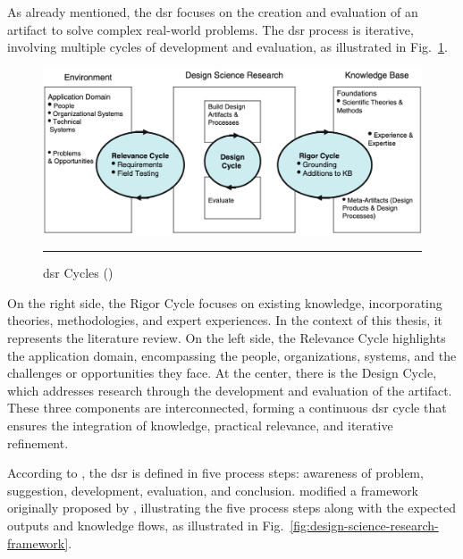 As already mentioned, the \gls{dsr} focuses on the creation and evaluation of an artifact to solve complex real-world problems.
The \gls{dsr} process is iterative, involving multiple cycles of development and evaluation, as illustrated in Fig.~\ref{fig:design-science-research-cycles}.

\begin{figure}[htbp]
    \centering
 \includegraphics[width=.9\textwidth]{03_Figures/research-methods/design-science-research-cycles.png}
     \rule{35em}{0.5pt}
    \caption{\acrlong{dsr} Cycles (\textcite{Hevner2010}) } 
 \label{fig:design-science-research-cycles}
\end{figure}

On the right side, the Rigor Cycle focuses on existing knowledge, incorporating theories, methodologies, and expert experiences.
In the context of this thesis, it represents the literature review.
On the left side, the Relevance Cycle highlights the application domain, encompassing the people, organizations, systems, and the challenges or opportunities they face.
At the center, there is the Design Cycle, which addresses research through the development and evaluation of the artifact.
These three components are interconnected, forming a continuous \gls{dsr} cycle that ensures the integration of knowledge, practical relevance, and iterative refinement.

According to \textcite{Hevner2010}, the \gls{dsr} is defined in five process steps: awareness of problem, suggestion, development, evaluation, and conclusion.
\textcite{Hevner2010} modified a framework originally proposed by \textcite{Vaishnavi2007}, illustrating the five process steps along with the expected outputs and knowledge flows, as illustrated in Fig.~\ref{fig:design-science-research-framework}.

